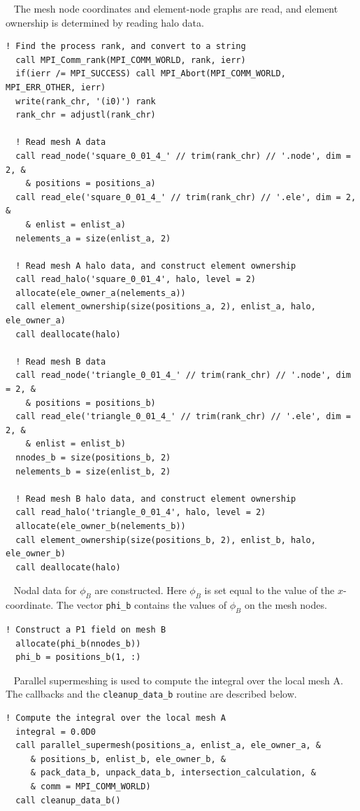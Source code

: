 \documentclass{article}
\begin{document}
~\newline
The mesh node coordinates and element-node graphs are read, and element
ownership is determined by reading halo data.
\begin{lstlisting}[language=FORTRAN]    
  ! Find the process rank, and convert to a string
  call MPI_Comm_rank(MPI_COMM_WORLD, rank, ierr)
  if(ierr /= MPI_SUCCESS) call MPI_Abort(MPI_COMM_WORLD, MPI_ERR_OTHER, ierr)
  write(rank_chr, '(i0)') rank
  rank_chr = adjustl(rank_chr)
  
  ! Read mesh A data
  call read_node('square_0_01_4_' // trim(rank_chr) // '.node', dim = 2, &
    & positions = positions_a)
  call read_ele('square_0_01_4_' // trim(rank_chr) // '.ele', dim = 2, &
    & enlist = enlist_a)
  nelements_a = size(enlist_a, 2)
    
  ! Read mesh A halo data, and construct element ownership
  call read_halo('square_0_01_4', halo, level = 2)
  allocate(ele_owner_a(nelements_a))
  call element_ownership(size(positions_a, 2), enlist_a, halo, ele_owner_a)
  call deallocate(halo)
    
  ! Read mesh B data
  call read_node('triangle_0_01_4_' // trim(rank_chr) // '.node', dim = 2, &
    & positions = positions_b)
  call read_ele('triangle_0_01_4_' // trim(rank_chr) // '.ele', dim = 2, &
    & enlist = enlist_b)
  nnodes_b = size(positions_b, 2)
  nelements_b = size(enlist_b, 2)
    
  ! Read mesh B halo data, and construct element ownership
  call read_halo('triangle_0_01_4', halo, level = 2)
  allocate(ele_owner_b(nelements_b))
  call element_ownership(size(positions_b, 2), enlist_b, halo, ele_owner_b)
  call deallocate(halo)
\end{lstlisting}

~\newline
Nodal data for $\phi_B$ are constructed. Here $\phi_B$ is set equal to the value
of the $x$-coordinate. The vector \verb+phi_b+ contains the values of $\phi_B$
on the mesh nodes.
\begin{lstlisting}[language=FORTRAN]
  ! Construct a P1 field on mesh B
  allocate(phi_b(nnodes_b))
  phi_b = positions_b(1, :)
\end{lstlisting}

~\newline
Parallel supermeshing is used to compute the integral over the local mesh A.
The callbacks and the \verb+cleanup_data_b+ routine are described below.
\begin{lstlisting}[language=FORTRAN]
  ! Compute the integral over the local mesh A
  integral = 0.0D0
  call parallel_supermesh(positions_a, enlist_a, ele_owner_a, &
     & positions_b, enlist_b, ele_owner_b, &
     & pack_data_b, unpack_data_b, intersection_calculation, &
     & comm = MPI_COMM_WORLD)
  call cleanup_data_b()
\end{lstlisting}
\end{document}
